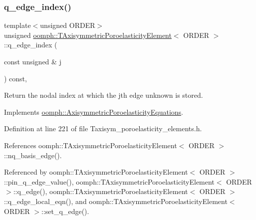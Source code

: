 \subsubsection{\texorpdfstring{q\+\_\+edge\+\_\+index()}{q\_edge\_index()}}
{\footnotesize\ttfamily template$<$unsigned O\+R\+D\+ER$>$ \\
unsigned \hyperlink{classoomph_1_1TAxisymmetricPoroelasticityElement}{oomph\+::\+T\+Axisymmetric\+Poroelasticity\+Element}$<$ O\+R\+D\+ER $>$\+::q\+\_\+edge\+\_\+index (\begin{DoxyParamCaption}\item[{const unsigned \&}]{j }\end{DoxyParamCaption}) const\hspace{0.3cm}{\ttfamily [inline]}, {\ttfamily [virtual]}}



Return the nodal index at which the jth edge unknown is stored. 



Implements \hyperlink{classoomph_1_1AxisymmetricPoroelasticityEquations_a5dc540a1c4f63f5023d2688aa15c2614}{oomph\+::\+Axisymmetric\+Poroelasticity\+Equations}.



Definition at line 221 of file Taxisym\+\_\+poroelasticity\+\_\+elements.\+h.



References oomph\+::\+T\+Axisymmetric\+Poroelasticity\+Element$<$ O\+R\+D\+E\+R $>$\+::nq\+\_\+basis\+\_\+edge().



Referenced by oomph\+::\+T\+Axisymmetric\+Poroelasticity\+Element$<$ O\+R\+D\+E\+R $>$\+::pin\+\_\+q\+\_\+edge\+\_\+value(), oomph\+::\+T\+Axisymmetric\+Poroelasticity\+Element$<$ O\+R\+D\+E\+R $>$\+::q\+\_\+edge(), oomph\+::\+T\+Axisymmetric\+Poroelasticity\+Element$<$ O\+R\+D\+E\+R $>$\+::q\+\_\+edge\+\_\+local\+\_\+eqn(), and oomph\+::\+T\+Axisymmetric\+Poroelasticity\+Element$<$ O\+R\+D\+E\+R $>$\+::set\+\_\+q\+\_\+edge().

\mbox{\label{classoomph_1_1TAxisymmetricPoroelasticityElement_ac6fcfbad57e73d5f6bacff687a67df4b}} 
